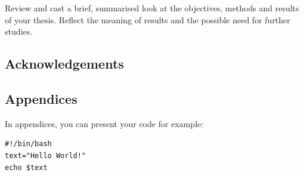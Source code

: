 \documentclass[english,twoside,openright]{HYgradu}
\begin{document}
Review and cast a brief, summarised look at the objectives, methods
and results of your thesis. Reflect the meaning of results and the
possible need for further studies.

\section{Acknowledgements}


\begin{appendices}
\myappendixtitle

\chapter{Appendices}

In appendices, you can present your code for example:

\begin{verbatim}
#!/bin/bash          
text="Hello World!"
echo $text
\end{verbatim}

\end{appendices}


\cleardoublepage %

\end{document}
